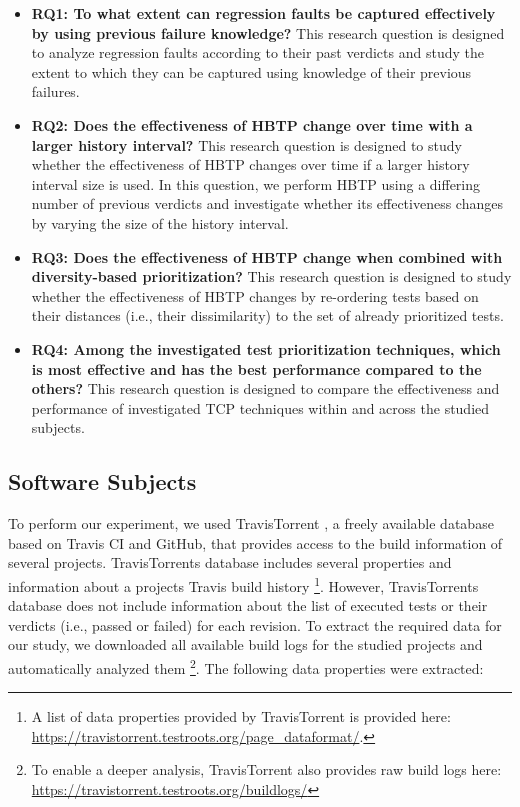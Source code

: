 \documentclass[1p]{elsarticle}
\begin{document}
\begin{itemize}
\item \textbf{RQ1: To what extent can regression faults be captured effectively by using previous failure knowledge?} This research question is designed to analyze regression faults according to their past verdicts and study the extent to which they can be captured using knowledge of their previous failures.

\item \textbf{RQ2: Does the effectiveness of HBTP change over time with a larger history interval?} This research question is designed to study whether the effectiveness of HBTP changes over time if a larger history interval size is used. In this question, we perform HBTP using a differing number of previous verdicts and investigate whether its effectiveness changes by varying the size of the history interval.

\item \textbf{RQ3: Does the effectiveness of HBTP change when combined with diversity-based prioritization?} This research question is designed to study whether the effectiveness of HBTP changes by re-ordering tests based on their distances (i.e., their dissimilarity) to the set of already prioritized tests.

\item \textbf{RQ4: Among the investigated test prioritization techniques, which is most effective and has the best performance compared to the others?} This research question is designed to compare the effectiveness and performance of investigated TCP techniques within and across the studied subjects.
\end{itemize}


\subsection{Software Subjects}

To perform our experiment, we used TravisTorrent \cite{msr17challenge}, a freely available database based on Travis CI and GitHub, that provides access to the build information of several projects. TravisTorrent\textsc{}s database includes several properties and information about a project\textsc{}s Travis build history \footnote{A list of data properties provided by TravisTorrent is provided here:
\url{https://travistorrent.testroots.org/page_dataformat/}.}. However, TravisTorrent\textsc{}s database does not include information about the list of executed tests or their verdicts (i.e., passed or failed) for each revision. To extract the required data for our study, we downloaded all available build logs for the studied projects and automatically analyzed them \footnote{To enable a deeper analysis, TravisTorrent also provides raw build logs here: \url{https://travistorrent.testroots.org/buildlogs/}}. The following data properties were extracted:
\end{document}
